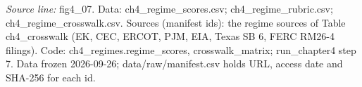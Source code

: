 {\scriptsize\textit{Source line:} fig4\_\allowbreak{}07. Data: ch4\_\allowbreak{}regime\_\allowbreak{}scores.csv; ch4\_\allowbreak{}regime\_\allowbreak{}rubric.csv; ch4\_\allowbreak{}regime\_\allowbreak{}crosswalk.csv. Sources (manifest ids): the regime sources of Table ch4\_\allowbreak{}crosswalk (EK, CEC, ERCOT, PJM, EIA, Texas SB 6, FERC RM26-4 filings). Code: ch4\_\allowbreak{}regimes.regime\_\allowbreak{}scores, crosswalk\_\allowbreak{}matrix; run\_\allowbreak{}chapter4 step 7. Data frozen 2026-09-26; data/raw/manifest.csv holds URL, access date and SHA-256 for each id.}